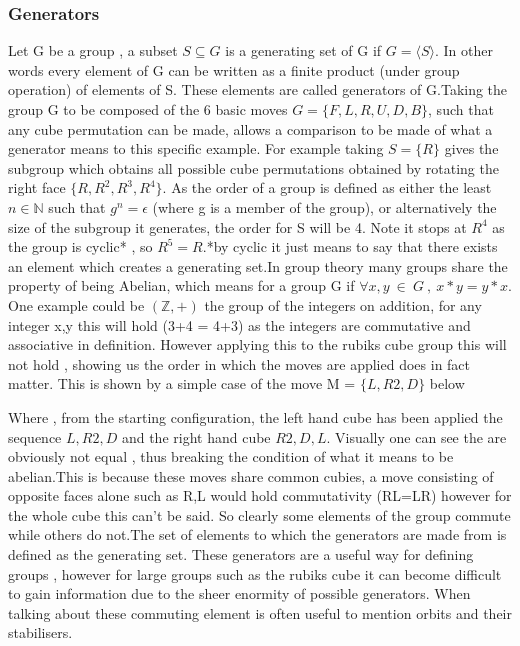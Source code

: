\documentclass{article}
\begin{document}
\subsubsection*{Generators}
Let G be a group , a subset $S\subseteq G$ is a generating set of G if $G =\langle S\rangle $. In other words every element of G can be written as a finite product (under group operation)  of elements of S. These elements are called generators of G.Taking the group G to be composed of the 6 basic moves  $G= \{{F,L,R,U,D,B}\}$, such that  any cube permutation can be made, allows  a comparison to be made of what a generator means to this specific example.  For example taking $S=\{R\}$ gives the subgroup which obtains all possible cube permutations obtained by rotating the right face $\{R,R^2,R^3,R^4\}$. As the order of a group is defined as either the least $n \in \mathbb{N}$ such that $g^n = \epsilon$ (where g is a member of the group),  or alternatively the size of the subgroup it generates, the order for S will be 4. Note it stops at $R^4$ as the group is cyclic* , so $R^5= R$.*by cyclic it just means to say that there exists an element which creates a generating set.\newline In group theory many groups share the property of being Abelian, which means for a group G if $\forall x,y\ \in\ G\ ,\ x*y=y*x$. One example could be $(\mathbb{Z},+)$ the group of the integers on addition, for any integer x,y this will hold (3+4 = 4+3) as the integers are commutative and associative in definition.
However applying this to the rubiks cube group this will not hold , showing us the order in which the moves are applied does in fact matter. This is shown by a simple case of the move M = $\{L,R2,D\}$ below

\begin{figure}[h]
\centering
  \RubikCubeSolved%
  \RubikCubeSolved%
  \hspace{.4cm}
\end{figure}
Where , from the starting configuration, the left hand cube has been applied the sequence ${L,R2,D}$ and the right hand cube ${R2,D,L}$. Visually one can see the are obviously not equal , thus breaking the condition of what it means to be abelian.This is because these moves share common cubies, a move consisting of opposite faces alone such as R,L would hold commutativity (RL=LR) however for the whole cube this can't be said. So clearly some elements of the group commute while others do not.\newline The set of elements to which the generators are made from is defined as the generating set. These generators are a useful way for defining groups , however for large groups such as the rubiks cube it can become difficult to gain information due to the sheer enormity of possible generators. When talking about these commuting element is often useful to mention orbits and their stabilisers. 
\end{document}
